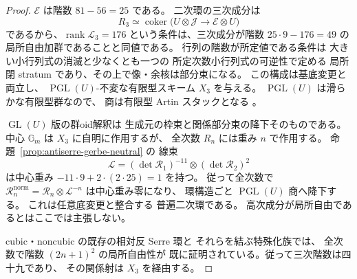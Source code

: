 \begin{proof}
$\mathcal E$ は階数 $81-56=25$ である。
二次環の三次成分は
\[
 R_3\simeq
 \operatorname{coker}\bigl(
 U\otimes\mathcal J\to\mathcal E\otimes U\bigr)
\]
であるから、$\operatorname{rank}\mathcal L_3=176$
という条件は、三次成分が階数
$25\cdot9-176=49$ の局所自由加群であることと同値である。
行列の階数が所定値である条件は
大きい小行列式の消滅と少なくとも一つの
所定次数小行列式の可逆性で定める
局所閉 stratum であり、その上で像・余核は部分束になる。
この構成は基底変更と両立し、
$\operatorname{PGL}(U)$-不変な有限型スキーム $X_3$ を与える。
$\operatorname{PGL}(U)$ は滑らかな有限型群なので、
商は有限型 Artin スタックとなる
\cite[Tag 0DLS]{StacksModuli}。

$\operatorname{GL}(U)$ 版の群oid解釈は
生成元の枠束と関係部分束の降下そのものである。
中心 $\mathbb G_m$ は $X_3$ に自明に作用するが、
全次数 $R_n$ には重み $n$ で作用する。
命題~\ref{prop:antiserre-gerbe-neutral} の
線束
\[
 \mathcal L=
 (\det\mathcal R_1)^{-11}
       \otimes(\det\mathcal R_2)^2
\]
は中心重み $-11\cdot9+2\cdot(2\cdot25)=1$ を持つ。
従って全次数で
$\mathcal R_n^{\mathrm{norm}}=
 \mathcal R_n\otimes\mathcal L^{-n}$
は中心重み零になり、
環構造ごと $\operatorname{PGL}(U)$ 商へ降下する。
これは任意底変更と整合する
普遍二次環である。
高次成分が局所自由であるとはここでは主張しない。

cubic・noncubic の既存の相対反 Serre 環と
それらを結ぶ特殊化族では、
全次数で階数 $(2n+1)^2$ の局所自由性が
既に証明されている。従って三次階数は四十九であり、
その関係射は $X_3$ を経由する。
\end{proof}

